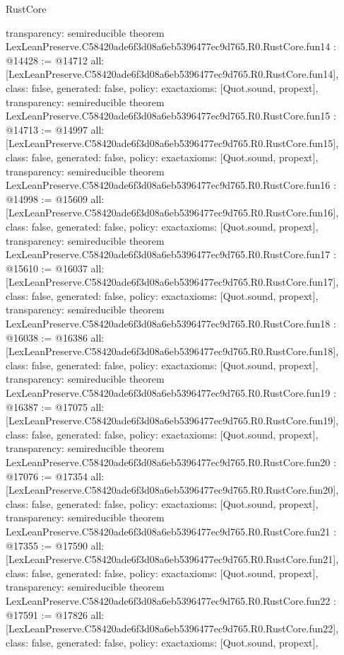 \begin{lexlean}{RustCore}
\begin{coremodule}
{  transparency: semireducible
}
theorem LexLeanPreserve.C58420ade6f3d08a6eb5396477ec9d765.R0.RustCore.fun14 : @14428 := @14712 {
  all: [LexLeanPreserve.C58420ade6f3d08a6eb5396477ec9d765.R0.RustCore.fun14],
  class: false,
  generated: false,
  policy: exact{axioms: [Quot.sound, propext]},
  transparency: semireducible
}
theorem LexLeanPreserve.C58420ade6f3d08a6eb5396477ec9d765.R0.RustCore.fun15 : @14713 := @14997 {
  all: [LexLeanPreserve.C58420ade6f3d08a6eb5396477ec9d765.R0.RustCore.fun15],
  class: false,
  generated: false,
  policy: exact{axioms: [Quot.sound, propext]},
  transparency: semireducible
}
theorem LexLeanPreserve.C58420ade6f3d08a6eb5396477ec9d765.R0.RustCore.fun16 : @14998 := @15609 {
  all: [LexLeanPreserve.C58420ade6f3d08a6eb5396477ec9d765.R0.RustCore.fun16],
  class: false,
  generated: false,
  policy: exact{axioms: [Quot.sound, propext]},
  transparency: semireducible
}
theorem LexLeanPreserve.C58420ade6f3d08a6eb5396477ec9d765.R0.RustCore.fun17 : @15610 := @16037 {
  all: [LexLeanPreserve.C58420ade6f3d08a6eb5396477ec9d765.R0.RustCore.fun17],
  class: false,
  generated: false,
  policy: exact{axioms: [Quot.sound, propext]},
  transparency: semireducible
}
theorem LexLeanPreserve.C58420ade6f3d08a6eb5396477ec9d765.R0.RustCore.fun18 : @16038 := @16386 {
  all: [LexLeanPreserve.C58420ade6f3d08a6eb5396477ec9d765.R0.RustCore.fun18],
  class: false,
  generated: false,
  policy: exact{axioms: [Quot.sound, propext]},
  transparency: semireducible
}
theorem LexLeanPreserve.C58420ade6f3d08a6eb5396477ec9d765.R0.RustCore.fun19 : @16387 := @17075 {
  all: [LexLeanPreserve.C58420ade6f3d08a6eb5396477ec9d765.R0.RustCore.fun19],
  class: false,
  generated: false,
  policy: exact{axioms: [Quot.sound, propext]},
  transparency: semireducible
}
theorem LexLeanPreserve.C58420ade6f3d08a6eb5396477ec9d765.R0.RustCore.fun20 : @17076 := @17354 {
  all: [LexLeanPreserve.C58420ade6f3d08a6eb5396477ec9d765.R0.RustCore.fun20],
  class: false,
  generated: false,
  policy: exact{axioms: [Quot.sound, propext]},
  transparency: semireducible
}
theorem LexLeanPreserve.C58420ade6f3d08a6eb5396477ec9d765.R0.RustCore.fun21 : @17355 := @17590 {
  all: [LexLeanPreserve.C58420ade6f3d08a6eb5396477ec9d765.R0.RustCore.fun21],
  class: false,
  generated: false,
  policy: exact{axioms: [Quot.sound, propext]},
  transparency: semireducible
}
theorem LexLeanPreserve.C58420ade6f3d08a6eb5396477ec9d765.R0.RustCore.fun22 : @17591 := @17826 {
  all: [LexLeanPreserve.C58420ade6f3d08a6eb5396477ec9d765.R0.RustCore.fun22],
  class: false,
  generated: false,
  policy: exact{axioms: [Quot.sound, propext]},
}
\end{coremodule}
\end{lexlean}
